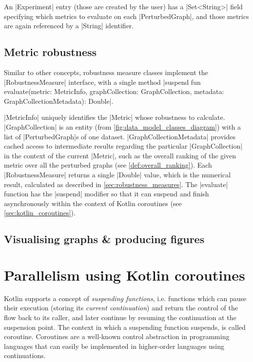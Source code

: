 An |Experiment| entry (those are created by the user) has a |Set<String>| field specifying which metrics to evaluate on each |PerturbedGraph|, and those metrics are again referenced by a |String| identifier.

\subsection{Metric robustness}

Similar to other concepts, robustness measure classes implement the |RobustnessMeasure| interface, with a single method |suspend fun evaluate(metric: MetricInfo, graphCollection: GraphCollection, metadata: GraphCollectionMetadata): Double|.

|MetricInfo| uniquely identifies the |Metric| whose robustness to calculate.
|GraphCollection| is an entity (from \autoref{fig:data_model_classes_diagram}) with a list of |PerturbedGraph|s of one dataset.
|GraphCollectionMetadata| provides cached\footnotemark{} access to intermediate results regarding the particular |GraphCollection| in the context of the current |Metric|, such as the overall ranking of the given metric over all the perturbed graphs (see \autoref{def:overall_ranking}).
Each |RobustnessMeasure| returns a single |Double| value, which is the numerical result, calculated as described in \autoref{sec:robustness_measures}.
The |evaluate| function has the |suspend| modifier so that it can suspend and finish asynchronously within the context of Kotlin coroutines (see \autoref{sec:kotlin_coroutines}).

\subsection{Visualising graphs \& producing figures}



\section{Parallelism using Kotlin coroutines}
\label{sec:kotlin_coroutines}

Kotlin supports a concept of \textsl{suspending functions}, i.e. functions which can pause their execution (storing its \textsl{current continuation}) and return the control of the flow back to its caller, and later continue by resuming the continuation at the suspension point.
The context in which a suspending function suspends, is called coroutine.
Coroutines are a well-known control abstraction in programming languages\cite{MouraRevisitingCoroutines2009} that can easily be implemented in higher-order languages using continuations\cite{HaynesContinuationsCoroutines1984}.

